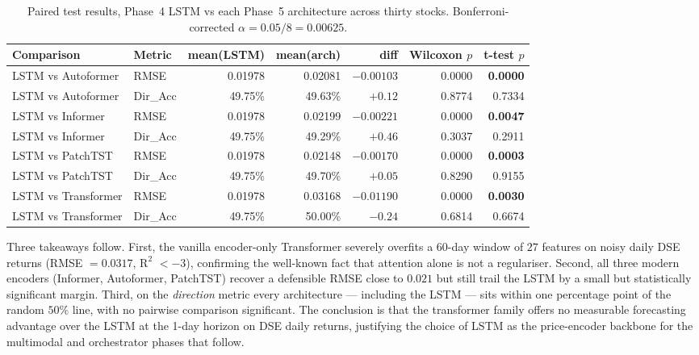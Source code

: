 \documentclass[12pt,a4paper,oneside]{report}
\begin{document}
\begin{table}[H]
  \centering
  \caption{Paired test results, Phase~4 \ac{LSTM} vs each Phase~5
  architecture across thirty stocks. Bonferroni-corrected
  $\alpha = 0.05 / 8 = 0.00625$.}
  \label{tab:phase5-stats}
  \begin{tabular}{llrrrrr}
    \toprule
    Comparison & Metric & mean(\ac{LSTM}) & mean(arch) & diff & Wilcoxon $p$ & t-test $p$ \\
    \midrule
    LSTM vs Autoformer & \ac{RMSE}   & 0.01978 & 0.02081 & $-0.00103$ & 0.0000 & \textbf{0.0000} \\
    LSTM vs Autoformer & Dir\_Acc    & 49.75\% & 49.63\% & $+0.12$    & 0.8774 & 0.7334 \\
    LSTM vs Informer   & \ac{RMSE}   & 0.01978 & 0.02199 & $-0.00221$ & 0.0000 & \textbf{0.0047} \\
    LSTM vs Informer   & Dir\_Acc    & 49.75\% & 49.29\% & $+0.46$    & 0.3037 & 0.2911 \\
    LSTM vs PatchTST   & \ac{RMSE}   & 0.01978 & 0.02148 & $-0.00170$ & 0.0000 & \textbf{0.0003} \\
    LSTM vs PatchTST   & Dir\_Acc    & 49.75\% & 49.70\% & $+0.05$    & 0.8290 & 0.9155 \\
    LSTM vs Transformer & \ac{RMSE}  & 0.01978 & 0.03168 & $-0.01190$ & 0.0000 & \textbf{0.0030} \\
    LSTM vs Transformer & Dir\_Acc   & 49.75\% & 50.00\% & $-0.24$    & 0.6814 & 0.6674 \\
    \bottomrule
  \end{tabular}
\end{table}

Three takeaways follow. First, the vanilla encoder-only
Transformer severely overfits a 60-day window of $27$ features
on noisy daily DSE returns (\ac{RMSE} $= 0.0317$, $\text{R}^2$
$< -3$), confirming the well-known fact that attention alone is
not a regulariser. Second, all three modern encoders
(Informer, Autoformer, PatchTST) recover a defensible
\ac{RMSE} close to $0.021$ but still trail the \ac{LSTM} by a
small but statistically significant margin. Third, on the
\emph{direction} metric every architecture — including the
\ac{LSTM} — sits within one percentage point of the random
$50\%$ line, with no pairwise comparison significant. The
conclusion is that the transformer family offers no measurable
forecasting advantage over the \ac{LSTM} at the 1-day horizon on
DSE daily returns, justifying the choice of \ac{LSTM} as the
price-encoder backbone for the multimodal and orchestrator
phases that follow.
\end{document}
